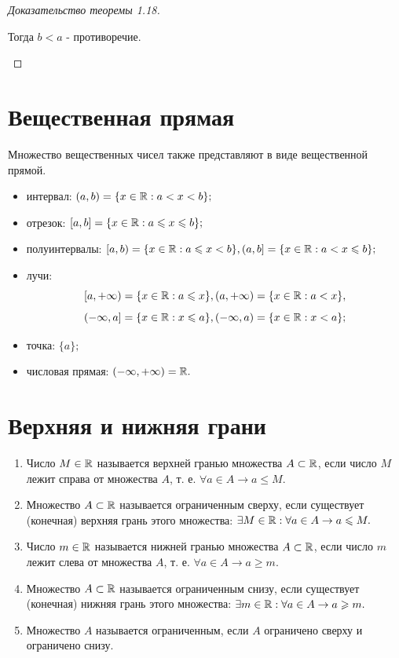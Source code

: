 \begin{proof}[Доказательство теоремы 1.18]
\begin{enumerate}
			Тогда $b < a$ - противоречие.	
		\end{enumerate}
	\end{proof}
	
	\section{Вещественная прямая}
	
	Множество вещественных чисел также представляют в виде вещественной прямой.
	
	\begin{definition}
		\begin{itemize}
			\item интервал: $(a, b) = \{x \in \mathbb R : a < x < b\};$
			\item отрезок: $[a, b] = \{x \in \mathbb R : a \leqslant x \leqslant b\};$
			\item полуинтервалы: $[a, b) = \{x \in \mathbb R : a \leqslant x < b\}, (a, b] = \{x \in \mathbb R : a < x \leqslant b\};$
			\item лучи:
			\[ [a, +\infty) = \{x \in \mathbb R : a \leqslant x\}, (a, +\infty) = \{x \in \mathbb R : a < x\}, \]
			\[ (-\infty, a] = \{x \in \mathbb R : x \leqslant a\}, (-\infty, a) = \{x \in \mathbb R : x < a\}; \]
			\item точка: $\{a\};$
			\item числовая прямая: $(-\infty, +\infty) = \mathbb R.$
		\end{itemize}
	\end{definition}
	
	\section{Верхняя и нижняя грани}
	
	\begin{definition}	
		\begin{enumerate}
			\item Число $M \in \mathbb R$ называется верхней гранью множества $A \subset \mathbb R$, если число $M$ лежит справа от множества $A$, т. е. $\forall a \in A \rightarrow a \leqslant M.$
			\item Множество $A \subset \mathbb R$ называется ограниченным сверху, если существует (конечная) верхняя грань этого множества: $\exists M \in \mathbb R : \forall a \in A \rightarrow a \leqslant M.$
			\item Число $m \in \mathbb R$ называется нижней гранью множества $A \subset \mathbb R$, если число $m$ лежит слева от множества $A$, т. е. $\forall a \in A \rightarrow a \geqslant m.$
			\item Множество $A \subset \mathbb R$ называется ограниченным снизу, если существует (конечная) нижняя грань этого множества: $\exists m \in \mathbb R : \forall a \in A \rightarrow a \geqslant m.$
			\item Множество $A$ называется ограниченным, если $A$ ограничено сверху и ограничено снизу.
		\end{enumerate}
	\end{definition}
	
